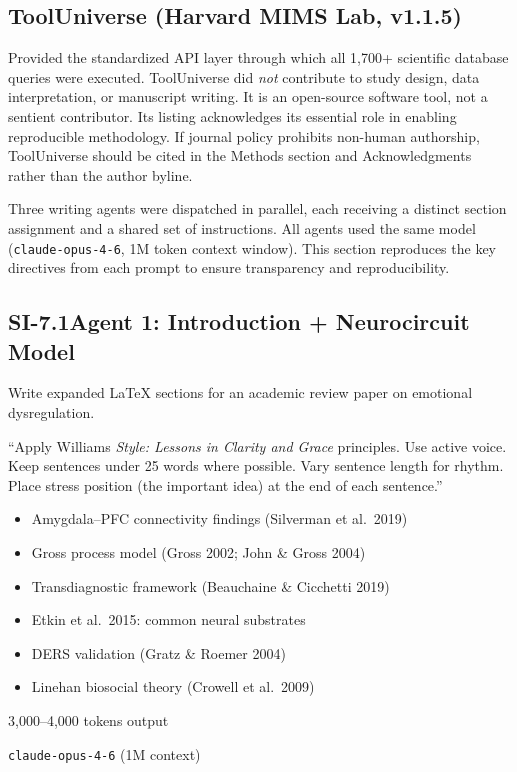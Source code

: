 \subsection*{ToolUniverse (Harvard MIMS Lab, v1.1.5)}

Provided the standardized API layer through which all 1,700+ scientific
database queries were executed.  ToolUniverse did \emph{not} contribute to
study design, data interpretation, or manuscript writing.  It is an
open-source software tool, not a sentient contributor.  Its listing
acknowledges its essential role in enabling reproducible methodology.  If
journal policy prohibits non-human authorship, ToolUniverse should be cited
in the Methods section and Acknowledgments rather than the author byline.



Three writing agents were dispatched in parallel, each receiving a distinct
section assignment and a shared set of instructions.  All agents used the same
model (\texttt{claude-opus-4-6}, 1M token context window).  This section
reproduces the key directives from each prompt to ensure transparency and
reproducibility.

\subsection*{SI-7.1\quad Agent 1: Introduction + Neurocircuit Model}

\begin{description}[style=nextline, nosep]
  \item[Assignment]
    Write expanded \LaTeX{} sections for an academic review paper on emotional
    dysregulation.
  \item[Key directive]
    ``Apply Williams \emph{Style: Lessons in Clarity and Grace} principles.
    Use active voice.  Keep sentences under 25 words where possible.  Vary
    sentence length for rhythm.  Place stress position (the important idea) at
    the end of each sentence.''
  \item[Evidence provided]
    \begin{itemize}[nosep]
      \item Amygdala--PFC connectivity findings (Silverman et al.\ 2019)
      \item Gross process model (Gross 2002; John \& Gross 2004)
      \item Transdiagnostic framework (Beauchaine \& Cicchetti 2019)
      \item Etkin et al.\ 2015: common neural substrates
      \item DERS validation (Gratz \& Roemer 2004)
      \item Linehan biosocial theory (Crowell et al.\ 2009)
    \end{itemize}
  \item[Approximate token budget] 3,000--4,000 tokens output
  \item[Model] \texttt{claude-opus-4-6} (1M context)
\end{description}

